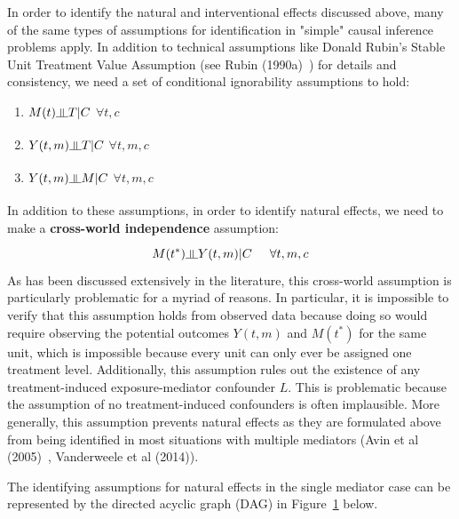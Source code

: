 \documentclass[12pt]{article} %
\numberwithin{equation}{section} %
\begin{document}
In order to identify the natural and interventional effects discussed above, many of the same types of assumptions for identification in "simple" causal inference problems apply. In addition to technical assumptions like Donald Rubin's Stable Unit Treatment Value Assumption (see Rubin (1990a)~\citep{rubin1990a}) for details and consistency, we need a set of conditional ignorability assumptions to hold:

\begin{enumerate}
\item $M(t) \indep T | C$  $\forall t, c$
\item $Y(t,m) \indep T | C$  $\forall t, m, c$
\item $Y(t,m) \indep M | C$  $\forall t, m, c$
\end{enumerate}

In addition to these assumptions, in order to identify natural effects, we need to make a \textbf{cross-world independence} assumption: 
$$M(t^*) \indep Y(t,m) | C \hspace{0.5cm} \forall t, m, c$$ 
As has been discussed extensively in the literature, this cross-world assumption is particularly problematic for a myriad of reasons. In particular, it is impossible to verify that this assumption holds from observed data because doing so would require observing the potential outcomes $Y(t,m)$ and $M(t^{*})$ for the same unit, which is impossible because every unit can only ever be assigned one treatment level. Additionally, this assumption rules out the existence of any treatment-induced exposure-mediator confounder $L$. This is problematic because the assumption of no treatment-induced confounders is often implausible. More generally, this assumption prevents natural effects as they are formulated above from being identified in most situations with multiple mediators (Avin et al (2005)~\citep{avinetal2005}, Vanderweele et al (2014)). 

The identifying assumptions for natural effects in the single mediator case can be represented by the directed acyclic graph (DAG) in Figure~\ref{fig:one_mediator_dag} below. 

\begin{figure}[ht]
\centering
{}
\caption[]{}
\label{fig:one_mediator_dag}
\end{figure}
\end{document}
